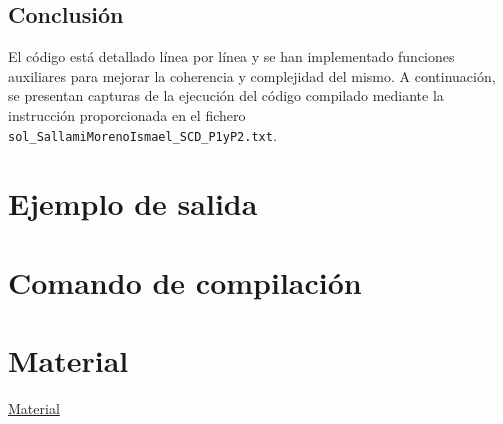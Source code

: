 \documentclass[a4paper,12pt]{article}
\begin{document}
\subsection{Conclusión}
El código está detallado línea por línea y se han implementado funciones auxiliares para mejorar la coherencia y complejidad del mismo. A continuación, se presentan capturas de la ejecución del código compilado mediante la instrucción proporcionada en el fichero \texttt{sol\_SallamiMorenoIsmael\_SCD\_P1yP2.txt}.

\section{Ejemplo de salida}



\section{Comando de compilación}


\section{Material}
\href{https://github.com/ElblogdeIsmael/ElblogdeIsmael.github.io/tree/main/Asignaturas/Tercer\%20A\%C3\%B1o/SCD/Examenes/Parcial_SCD_Extra}{Material}
\end{document}
